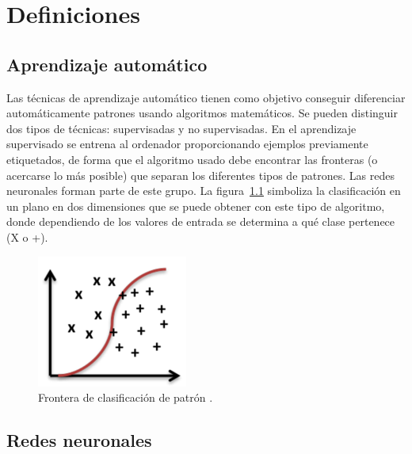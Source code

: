 

\chapter{Definiciones} %

\label{Definiciones} %


\section{Aprendizaje automático}

Las técnicas de aprendizaje automático tienen como objetivo conseguir diferenciar automáticamente patrones usando algoritmos matemáticos. Se pueden distinguir dos tipos de técnicas: supervisadas y no supervisadas. En el aprendizaje supervisado se entrena al ordenador proporcionando ejemplos previamente etiquetados, de forma que el algoritmo usado debe encontrar las fronteras (o acercarse lo más posible) que separan los diferentes tipos de patrones. Las redes neuronales forman parte de este grupo. La figura~\ref{fig:frontera} simboliza la clasificación en un plano en dos dimensiones que se puede obtener con este tipo de algoritmo, donde dependiendo de los valores de entrada se determina a qué clase pertenece (X o +).

\begin{figure}[th]
\centering
\includegraphics{Figures/figura_02.PNG}
\decoRule
\caption[Frontera de clasificación]{Frontera de clasificación de patrón \parencite{r63}.}
\label{fig:frontera}
\end{figure}


\section{Redes neuronales}

